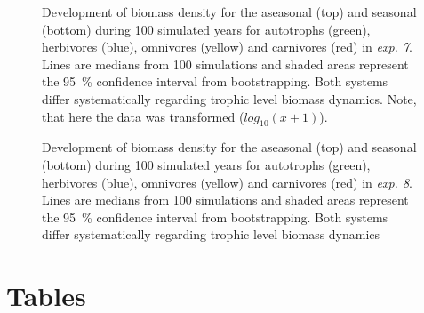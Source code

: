 \begin{appendices}
\clearpage


\begin{figure}[h!]
\centering

\caption[Log-body mass density time series for \textit{exp. 7} in both systems]{Development of biomass density for the aseasonal (top) and seasonal (bottom) during 100 simulated years for autotrophs (green), herbivores (blue), omnivores (yellow) and carnivores (red) in \textit{exp. 7}. Lines are medians from 100 simulations and shaded areas represent the 95~\% confidence interval from bootstrapping. Both systems differ systematically regarding trophic level biomass dynamics. Note, that here the data was transformed ($log_{10}(x+1)$).}
\label{fig:chap:res:ts:expno7}
\end{figure}

\clearpage


\begin{figure}[h!]
\centering

\caption[Log-body mass density time series for \textit{exp. 8} in both systems]{Development of biomass density for the aseasonal (top) and seasonal (bottom) during 100 simulated years for autotrophs (green), herbivores (blue), omnivores (yellow) and carnivores (red) in \textit{exp. 8}. Lines are medians from 100 simulations and shaded areas represent the 95~\% confidence interval from bootstrapping. Both systems differ systematically regarding trophic level biomass dynamics}
\label{fig:chap:res:ts:expno8}
\end{figure}

\clearpage

\chapter{Tables}
%
%


\small

%

%




\end{appendices}
